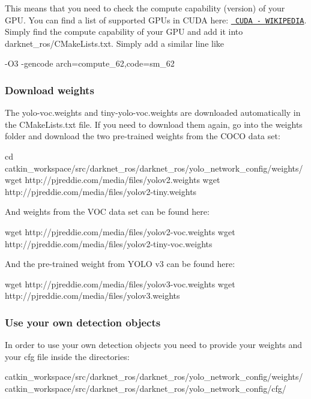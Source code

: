 This means that you need to check the compute capability (version) of your G\+PU. You can find a list of supported G\+P\+Us in C\+U\+DA here\+: \href{https://en.wikipedia.org/wiki/CUDA\#Supported_GPUs}{\texttt{ C\+U\+DA -\/ W\+I\+K\+I\+P\+E\+D\+IA}}. Simply find the compute capability of your G\+PU and add it into darknet\+\_\+ros/\+C\+Make\+Lists.\+txt. Simply add a similar line like \begin{DoxyVerb}-O3 -gencode arch=compute_62,code=sm_62
\end{DoxyVerb}


\subsubsection*{Download weights}

The yolo-\/voc.\+weights and tiny-\/yolo-\/voc.\+weights are downloaded automatically in the C\+Make\+Lists.\+txt file. If you need to download them again, go into the weights folder and download the two pre-\/trained weights from the C\+O\+CO data set\+: \begin{DoxyVerb}cd catkin_workspace/src/darknet_ros/darknet_ros/yolo_network_config/weights/
wget http://pjreddie.com/media/files/yolov2.weights
wget http://pjreddie.com/media/files/yolov2-tiny.weights
\end{DoxyVerb}


And weights from the V\+OC data set can be found here\+: \begin{DoxyVerb}wget http://pjreddie.com/media/files/yolov2-voc.weights
wget http://pjreddie.com/media/files/yolov2-tiny-voc.weights
\end{DoxyVerb}


And the pre-\/trained weight from Y\+O\+LO v3 can be found here\+: \begin{DoxyVerb}wget http://pjreddie.com/media/files/yolov3-voc.weights
wget http://pjreddie.com/media/files/yolov3.weights
\end{DoxyVerb}


\subsubsection*{Use your own detection objects}

In order to use your own detection objects you need to provide your weights and your cfg file inside the directories\+: \begin{DoxyVerb}catkin_workspace/src/darknet_ros/darknet_ros/yolo_network_config/weights/
catkin_workspace/src/darknet_ros/darknet_ros/yolo_network_config/cfg/
\end{DoxyVerb}


